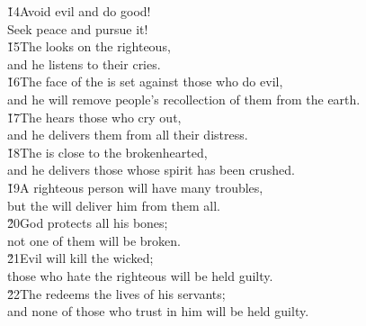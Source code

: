 \begin{poetry}
\poeml \v{14}Avoid evil and do good! \\
\poemll    Seek peace and pursue it! \\
\poeml \v{15}The  looks on the righteous, \\
\poemll    and he listens to their cries. \\
\poeml \v{16}The face of the  is set against those who do evil, \\
\poemll    and he will remove people's recollection of them from the earth. \\
\poeml \v{17}The  hears those who cry out, \\
\poemll    and he delivers them from all their distress. \\
\poeml \v{18}The  is close to the brokenhearted, \\
\poemll    and he delivers those whose spirit has been crushed. \\
\poeml \v{19}A righteous person will have many troubles, \\
\poemll    but the  will deliver him from them all. \\
\poeml \v{20}God protects all his bones; \\
\poemll    not one of them will be broken. \\
\poeml \v{21}Evil will kill the wicked; \\
\poemll    those who hate the righteous will be held guilty. \\
\poeml \v{22}The  redeems the lives of his servants; \\
\poemll    and none of those who trust in him will be held guilty.
\end{poetry}


